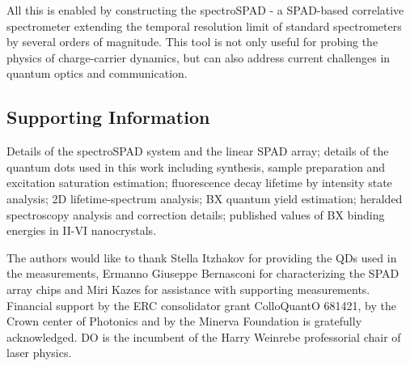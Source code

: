 \documentclass[journal=nalefd, manuscript=letter, layout=twocolumn]{achemso}
\begin{document}
All this is enabled by constructing the spectroSPAD - a SPAD-based correlative spectrometer extending the temporal resolution limit of standard spectrometers by several orders of magnitude. This tool is not only useful for probing the physics of charge-carrier dynamics, but can also address current challenges in quantum optics and communication.

\subsection*{Supporting Information}
Details of the spectroSPAD system and the linear SPAD array; details of the quantum dots used in this work including synthesis, sample preparation and excitation saturation estimation; fluorescence decay lifetime by intensity state analysis; 2D lifetime-spectrum analysis; BX quantum yield estimation; heralded spectroscopy analysis and correction details; published values of BX binding energies in II-VI nanocrystals.

\begin{acknowledgement}
The authors would like to thank Stella Itzhakov for providing the QDs used in the measurements, Ermanno Giuseppe Bernasconi for characterizing the SPAD array chips and Miri Kazes for assistance with supporting measurements. Financial support by the ERC consolidator grant ColloQuantO 681421, by the Crown center of Photonics and by the Minerva Foundation is gratefully acknowledged. DO is the incumbent of the Harry Weinrebe professorial chair of laser physics.
\end{acknowledgement}


\end{document}
